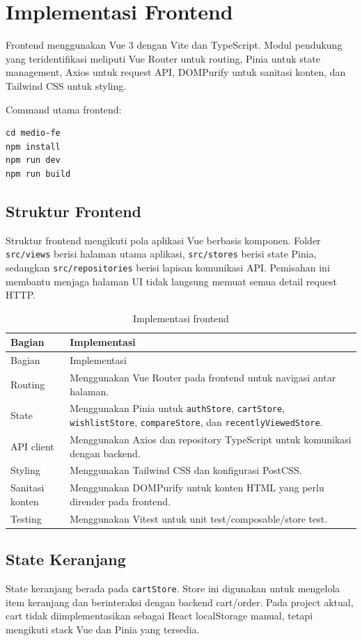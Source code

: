 \documentclass[12pt,a4paper]{report}
\begin{document}
\section{Implementasi Frontend}
Frontend menggunakan Vue 3 dengan Vite dan TypeScript. Modul pendukung yang teridentifikasi meliputi Vue Router untuk routing, Pinia untuk state management, Axios untuk request API, DOMPurify untuk sanitasi konten, dan Tailwind CSS untuk styling.

Command utama frontend:
\begin{verbatim}
cd medio-fe
npm install
npm run dev
npm run build
\end{verbatim}

\subsection{Struktur Frontend}
Struktur frontend mengikuti pola aplikasi Vue berbasis komponen. Folder \texttt{src/views} berisi halaman utama aplikasi, \texttt{src/stores} berisi state Pinia, sedangkan \texttt{src/repositories} berisi lapisan komunikasi API. Pemisahan ini membantu menjaga halaman UI tidak langsung memuat semua detail request HTTP.

\begin{longtable}{p{}p{}}
\caption{Implementasi frontend}\\
\toprule
Bagian & Implementasi \\
\midrule
\endfirsthead
\toprule
Bagian & Implementasi \\
\midrule
\endhead
Routing & Menggunakan Vue Router pada frontend untuk navigasi antar halaman. \\
State & Menggunakan Pinia untuk \texttt{authStore}, \texttt{cartStore}, \texttt{wishlistStore}, \texttt{compareStore}, dan \texttt{recentlyViewedStore}. \\
API client & Menggunakan Axios dan repository TypeScript untuk komunikasi dengan backend. \\
Styling & Menggunakan Tailwind CSS dan konfigurasi PostCSS. \\
Sanitasi konten & Menggunakan DOMPurify untuk konten HTML yang perlu dirender pada frontend. \\
Testing & Menggunakan Vitest untuk unit test/composable/store test. \\
\bottomrule
\end{longtable}

\subsection{State Keranjang}
State keranjang berada pada \texttt{cartStore}. Store ini digunakan untuk mengelola item keranjang dan berinteraksi dengan backend cart/order. Pada project aktual, cart tidak diimplementasikan sebagai React localStorage manual, tetapi mengikuti stack Vue dan Pinia yang tersedia.
\end{document}

